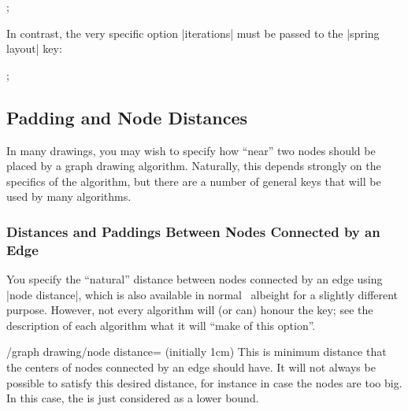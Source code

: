 \begin{codeexample}[]
\tikz {};  
\end{codeexample}

In contrast, the very specific option |iterations| must be
passed to the |spring layout| key:

\begin{codeexample}[]
\tikz {};  
\end{codeexample}





\subsection{Padding and Node Distances}

\label{subsection-gd-dist-pad}

In many drawings, you may wish to specify how ``near'' two nodes should
be placed by a graph drawing algorithm. Naturally, this depends
strongly on the specifics of the algorithm, but there are a number of
general keys that will be used by many algorithms.


\subsubsection{Distances and Paddings Between Nodes Connected by an Edge}

You specify the ``natural'' distance between nodes
connected by an edge using |node distance|, which is also available in
normal \tikzname\ albeight for a slightly different purpose. However,
not every algorithm will (or can) honour the key; see the description
of each algorithm what it will ``make of this option''.

\begin{key}{/graph drawing/node distance= (initially 1cm)}
  This is minimum distance that the centers of nodes connected by an
  edge should have. It will not always be possible to satisfy this
  desired distance, for instance in case the nodes are too big. In
  this case, the  is just considered as a lower bound.
\begin{codeexample}[]
\end{codeexample}
\end{key}


